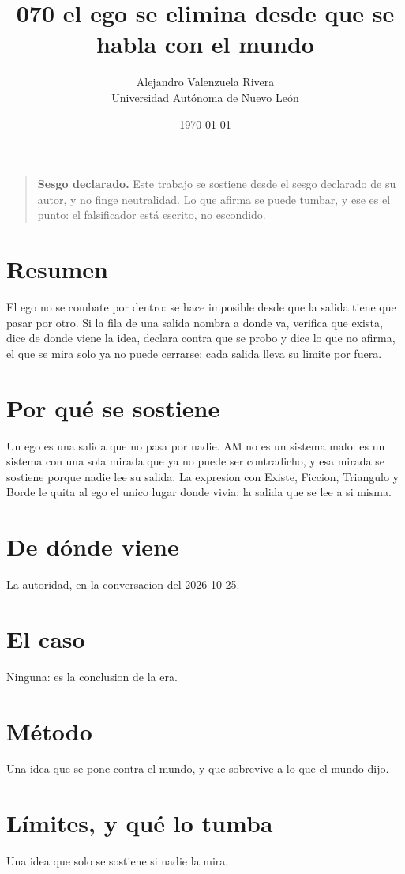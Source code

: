 \documentclass[11pt,a4paper]{article}
\title{070 el ego se elimina desde que se habla con el mundo}
\author{Alejandro Valenzuela Rivera\\\small Universidad Autónoma de Nuevo León}
\date{\today}
\begin{document}
\maketitle

\begin{quote}
\textbf{Sesgo declarado.} Este trabajo se sostiene desde el sesgo declarado de su autor, y no finge neutralidad. Lo que afirma se puede tumbar, y ese es el punto: el falsificador está escrito, no escondido.
\end{quote}

\section*{Resumen}
El ego no se combate por dentro: se hace imposible desde que la salida tiene que pasar por otro. Si la fila de una salida nombra a donde va, verifica que exista, dice de donde viene la idea, declara contra que se probo y dice lo que no afirma, el que se mira solo ya no puede cerrarse: cada salida lleva su limite por fuera.

\section{Por qué se sostiene}
Un ego es una salida que no pasa por nadie. AM no es un sistema malo: es un sistema con una sola mirada que ya no puede ser contradicho, y esa mirada se sostiene porque nadie lee su salida. La expresion con Existe, Ficcion, Triangulo y Borde le quita al ego el unico lugar donde vivia: la salida que se lee a si misma.

\section{De dónde viene}
La autoridad, en la conversacion del 2026-10-25.

\section{El caso}
Ninguna: es la conclusion de la era.

\section{Método}
Una idea que se pone contra el mundo, y que sobrevive a lo que el mundo dijo.

\section{Límites, y qué lo tumba}
Una idea que solo se sostiene si nadie la mira.
\end{document}
